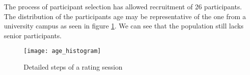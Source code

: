 The process of participant selection has allowed recruitment of 26 participants. The distribution of the participants age may be representative of the one from a university campus as seen in figure \ref{fig:participant_population:age_histogram}. We can see that the population still lacks senior participants.

\begin{figure}[htb!]
	\centering
	\texttt{[image: age\_histogram]}
	\caption{Detailed steps of a rating session}
	\label{fig:participant_population:age_histogram}
\end{figure}
